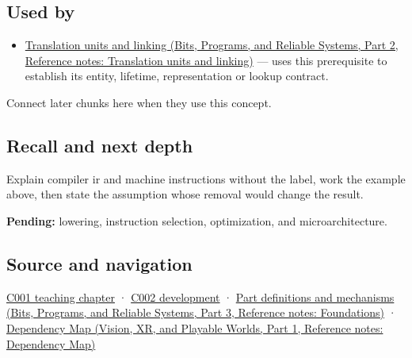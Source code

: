 \subsection{Used by}\label{appendix-942ad41afb30-used-by}

\hypertarget{appendix-942ad41afb30-used-by}{}

\begin{itemize}
\tightlist
\item
  \href{../01-Bits-Programs-and-Reliable-Systems-P02/main.pdf\#nameddest=appendix-806686359e1b}{Translation units and linking (Bits, Programs, and Reliable Systems, Part 2, Reference notes: Translation units and linking)} --- uses this prerequisite to establish its entity, lifetime, representation or lookup contract.
\end{itemize}

Connect later chunks here when they use this concept.

\subsection{Recall and next depth}\label{appendix-942ad41afb30-recall-and-next-depth}

\hypertarget{appendix-942ad41afb30-recall-and-next-depth}{}

Explain compiler ir and machine instructions without the label, work the example above, then state the assumption whose removal would change the result.

\textbf{Pending:} lowering, instruction selection, optimization, and microarchitecture.

\subsection{Source and navigation}\label{appendix-942ad41afb30-source-and-navigation}

\hypertarget{appendix-942ad41afb30-source-and-navigation}{}

\hyperref[01-foundations-i-ch001-from-a-signal-to-an-interpretation]{C001 teaching chapter} · \hyperref[01-foundations-i-ch001-arithmetic-becomes-a-policy]{C002 development} · \href{../01-Bits-Programs-and-Reliable-Systems-P03/main.pdf\#nameddest=appendix-fd090d982a15}{Part definitions and mechanisms (Bits, Programs, and Reliable Systems, Part 3, Reference notes: Foundations)} · \href{../07-Vision-XR-and-Playable-Worlds-P01/main.pdf\#nameddest=appendix-4ad47bdd269a}{Dependency Map (Vision, XR, and Playable Worlds, Part 1, Reference notes: Dependency Map)}
